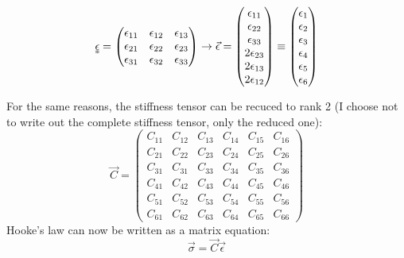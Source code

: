 \begin{equation}
	\uuline{\epsilon} = 
	\begin{pmatrix}
	\epsilon_{11} & \epsilon_{12} & \epsilon_{13} \\
	\epsilon_{21} & \epsilon_{22} & \epsilon_{23} \\
	\epsilon_{31} & \epsilon_{32} & \epsilon_{33} \\ 
	\end{pmatrix}
	\to 
	\vec{\epsilon} = 
	\begin{pmatrix}
	\epsilon_{11} \\ \epsilon_{22} \\ \epsilon_{33} \\ 2\epsilon_{23} \\ 2\epsilon_{13} \\ 2\epsilon_{12}
	\end{pmatrix}
	\equiv
	\begin{pmatrix}
	\epsilon_{1} \\ \epsilon_{2} \\ \epsilon_{3} \\ \epsilon_{4} \\ \epsilon_{5} \\ \epsilon_{6}
	\end{pmatrix}
\end{equation}

For the same reasons, the stiffness tensor can be recuced to rank 2 (I choose not to write out the complete stiffness tensor, only the reduced one):
\begin{equation}
	\vec{C} =
	\begin{pmatrix}
	C_{11} & C_{12} & C_{13} & C_{14} & C_{15} & C_{16} \\
	C_{21} & C_{22} & C_{23} & C_{24} & C_{25} & C_{26} \\
	C_{31} & C_{31} & C_{33} & C_{34} & C_{35} & C_{36} \\
	C_{41} & C_{42} & C_{43} & C_{44} & C_{45} & C_{46} \\
	C_{51} & C_{52} & C_{53} & C_{54} & C_{55} & C_{56} \\
	C_{61} & C_{62} & C_{63} & C_{64} & C_{65} & C_{66}
	\end{pmatrix}
\end{equation}
Hooke's law can now be written as a matrix equation:
\begin{equation}
	\vec{\sigma} = \vec{C}\vec{\epsilon}
\end{equation}


